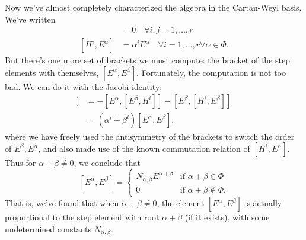 Now we've almost completely characterized the algebra in the Cartan-Weyl basis. We've written
\begin{align*}
[H^i,H^j]&=0 \quad\forall i,j=1,\ldots,r\\{}
[H^i,E^\alpha]&= \alpha^i E^\alpha \quad\forall i=1,\ldots,r \forall \alpha \in \Phi.
\end{align*}
But there's one more set of brackets we must compute: the bracket of the step elements with themselves, $[E^\alpha,E^\beta]$. Fortunately, the computation is not too bad. We can do it with the Jacobi identity:
\begin{align*}
[H^i,[E^\alpha,E^\beta]]&=-[E^\alpha,[E^\beta,H^i]]-[E^\beta,[H^i,E^\beta]]\\
&=(\alpha^i+\beta^i)[E^\alpha,E^\beta],
\end{align*}
where we have freely used the antisymmetry of the brackets to switch the order of $E^\beta,E^\alpha$, and also made use of the known commutation relation of $[H^i,E^\alpha]$. Thus for $\alpha+\beta \neq 0$, we conclude that
$$[E^\alpha,E^\beta]=\begin{cases}
N_{\alpha,\beta}E^{\alpha+\beta} & \text{if }\alpha+\beta\in \Phi\\
0 & \text{if }\alpha+\beta\not\in \Phi.
\end{cases}
$$
That is, we've found that when $\alpha+\beta\neq 0$, the element $[E^\alpha,E^\beta]$ is actually proportional to the step element with root $\alpha+\beta$ (if it exists), with some undetermined constants $N_{\alpha,\beta}.$
